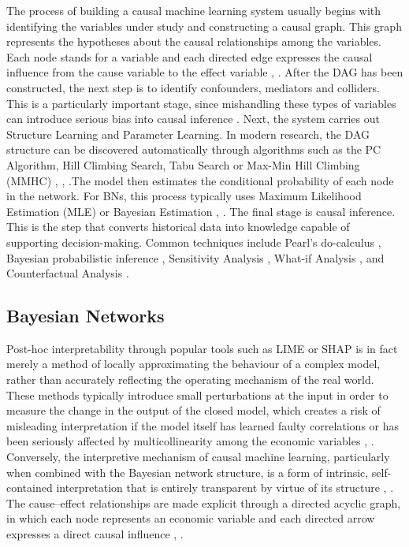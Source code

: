 The process of building a causal machine learning system usually begins with identifying the variables under study and constructing a causal graph. This graph represents the hypotheses about the causal relationships among the variables. Each node stands for a variable and each directed edge expresses the causal influence from the cause variable to the effect variable \cite{pearl2009causality}, \cite{spirtes2000causation}. After the DAG has been constructed, the next step is to identify confounders, mediators and colliders. This is a particularly important stage, since mishandling these types of variables can introduce serious bias into causal inference \cite{spirtes2000causation}.
Next, the system carries out Structure Learning and Parameter Learning. In modern research, the DAG structure can be discovered automatically through algorithms such as the PC Algorithm, Hill Climbing Search, Tabu Search or Max-Min Hill Climbing (MMHC) \cite{koller2009probabilistic}, \cite{jensen2007bayesian}, \cite{spirtes2000causation}.The model then estimates the conditional probability of each node in the network. For BNs, this process typically uses Maximum Likelihood Estimation (MLE) or Bayesian Estimation \cite{darwiche2009modeling}, \cite{jensen2007bayesian}.
The final stage is causal inference. This is the step that converts historical data into knowledge capable of supporting decision-making. Common techniques include Pearl's do-calculus \cite{pearl2009causality}, Bayesian probabilistic inference \cite{darwiche2009modeling}, Sensitivity Analysis \cite{kamal2021sensitivity}, What-if Analysis \cite{liu2024credit}, \cite{kamal2021sensitivity} and Counterfactual Analysis \cite{bueff2022counterfactual}.

\subsection{Bayesian Networks}
\noindent
Post-hoc interpretability through popular tools such as LIME \cite{ribeiro2016trust} or SHAP \cite{lundberg2017unified} is in fact merely a method of locally approximating the behaviour of a complex model, rather than accurately reflecting the operating mechanism of the real world. These methods typically introduce small perturbations at the input in order to measure the change in the output of the closed model, which creates a risk of misleading interpretation if the model itself has learned faulty correlations or has been seriously affected by multicollinearity among the economic variables \cite{lessmann2015benchmarking}, \cite{florez2015enhancing}. Conversely, the interpretive mechanism of causal machine learning, particularly when combined with the Bayesian network structure, is a form of intrinsic, self-contained interpretation that is entirely transparent by virtue of its structure \cite{koller2009probabilistic}, \cite{darwiche2009modeling}. The cause--effect relationships are made explicit through a directed acyclic graph, in which each node represents an economic variable and each directed arrow expresses a direct causal influence \cite{jensen2007bayesian}, \cite{liu2024credit}.

